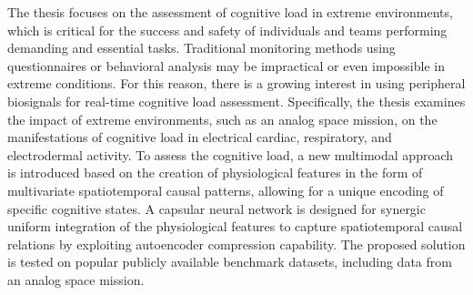 The thesis focuses on the assessment of cognitive load in extreme environments,
which is critical for the success and safety of individuals and teams performing
demanding and essential tasks. Traditional monitoring methods using
questionnaires or behavioral analysis may be impractical or even impossible in
extreme conditions. For this reason, there is a growing interest in using
peripheral biosignals for real-time cognitive load assessment. Specifically, the
thesis examines the impact of extreme environments, such as an analog space
mission, on the manifestations of cognitive load in electrical cardiac,
respiratory, and electrodermal activity. To assess the cognitive load, a new
multimodal approach is introduced based on the creation of physiological
features in the form of multivariate spatiotemporal causal patterns, allowing
for a unique encoding of specific cognitive states. A capsular neural network is
designed for synergic uniform integration of the physiological features to
capture spatiotemporal causal relations by exploiting autoencoder compression
capability. The proposed solution is tested on popular publicly available
benchmark datasets, including data from an analog space mission.